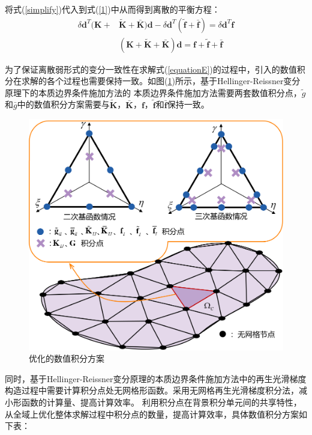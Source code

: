将式(\ref{simplify})代入到式(\ref{1})中从而得到离散的平衡方程：
\begin{equation}\label{equationE}
\begin{split}
    \delta\pmb{d}^T(\pmb{K}+&\tilde{\pmb{K}}+\bar{\pmb{K}})\pmb{d}-\delta\pmb{d}^T(\tilde{\pmb{f}}+\bar{\pmb{f}})=\delta\pmb{d}^T\pmb{f}\\
    &(\pmb{K}+\pmb{\tilde{K}}+\pmb{\bar{K}})\pmb{d}=\pmb{f}+\tilde{\pmb{f}}+\bar{\pmb{f}}
\end{split}
\end{equation}\par
为了保证离散弱形式的变分一致性在求解式(\ref{equationE})的过程中，引入的数值积分在求解的各个过程也需要保持一致。如图(\ref{strain})所示，基于Hellinger-Reissner变分原理下的本质边界条件施加方法的
本质边界条件施加方法需要两套数值积分点，$\tilde{g}$和$\bar{g}$中的数值积分方案需要与$\tilde{\pmb{K}}$，$\bar{\pmb{K}}$，$\pmb{f}$，$\tilde{\pmb{f}}$和$\bar{\pmb{f}}$保持一致。\par
\begin{figure}[!h]
    \centering
    \includegraphics[scale=0.5]{figure/strain.png}
    \caption{优化的数值积分方案}\label{strain}
\end{figure}\newpage
同时，基于Hellinger-Reissner变分原理的本质边界条件施加方法中的再生光滑梯度构造过程中需要计算积分点处无网格形函数。采用无网格再生光滑梯度积分法，减小形函数的计算量、提高计算效率。
利用积分点在背景积分单元间的共享特性，从全域上优化整体求解过程中积分点的数量，提高计算效率，具体数值积分方案如下表：\par    
